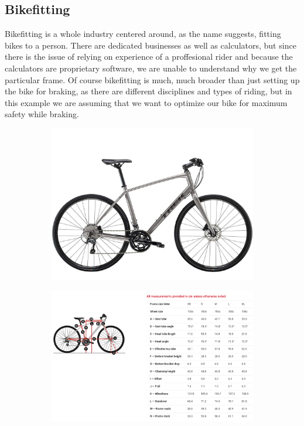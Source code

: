 \documentclass[12pt, a4]{article}
\begin{document}
\subsection{Bikefitting}
Bikefitting is a whole industry centered around, as the name suggests, fitting bikes to a person. There are
dedicated businesses as well as calculators, but since there is the issue of relying on experience of a 
proffesional rider and because the calculators are proprietary software, we are unable to understand why we get
the particular frame. Of course bikefitting is much, much broader than just setting up the bike for braking, as there
are different disciplines and types of riding, but in this example we are assuming that we want to optimize our bike
for maximum safety while braking. \\
\begin{figure}[H]
\centering 
\begin{subfigure}[b]{0.45\linewidth}
\includegraphics[width=\linewidth]{trek_fx_sport_4}%
\label{fig:trek_fx_sport_4_pic}
\caption{}
\end{subfigure}
\begin{subfigure}[b]{0.45\linewidth}
\includegraphics[width=\linewidth]{trek_fx_sport_4_geo}%
\label{fig:trek_fx_sport_4_geo}
\caption{}
\end{subfigure}
\end{figure}
\end{document}
